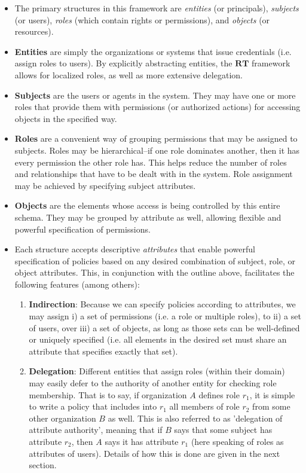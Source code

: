\documentclass{article}
\providecommand{\RT}{\textbf{RT}}
\begin{document}
\begin{itemize}
  \item The primary structures in this framework are \textit{entities} (or principals), \textit{subjects} (or users), \textit{roles} (which contain rights or permissions), and \textit{objects} (or resources).
  \item \textbf{Entities} are simply the organizations or systems that issue credentials (i.e. assign roles to users). By explicitly abstracting entities, the $\RT$ framework allows for localized roles, as well as more extensive delegation.
  \item \textbf{Subjects} are the users or agents in the system. They may have one or more roles that provide them with permissions (or authorized actions) for accessing objects in the specified way.
  \item \textbf{Roles} are a convenient way of grouping permissions that may be assigned to subjects. Roles may be hierarchical--if one role dominates another, then it has every permission the other role has. This helps reduce the number of roles and relationships that have to be dealt with in the system. Role assignment may be achieved by specifying subject attributes.
  \item \textbf{Objects} are the elements whose access is being controlled by this entire schema. They may be grouped by attribute as well, allowing flexible and powerful specification of permissions.
  \item Each structure accepts descriptive \textit{attributes} that enable powerful specification of policies based on any desired combination of subject, role, or object attributes. This, in conjunction with the outline above, facilitates the following features (among others):
  \begin{enumerate}
    \item \textbf{Indirection}: Because we can specify policies according to attributes, we may assign i) a set of permissions (i.e. a role or multiple roles), to ii) a set of users, over iii) a set of objects, as long as those sets can be well-defined or uniquely specified (i.e. all elements in the desired set must share an attribute that specifies exactly that set).
    \item \textbf{Delegation}: Different entities that assign roles (within their domain) may easily defer to the authority of another entity for checking role membership. That is to say, if organization $A$ defines role $r_1$, it is simple to write a policy that includes into $r_1$ all members of role $r_2$ from some other organization $B$ as well. This is also referred to as 'delegation of attribute authority', meaning that if $B$ says that some subject has attribute $r_2$, then $A$ says it has attribute $r_1$ (here speaking of roles as attributes of users). Details of how this is done are given in the next section.

\end{enumerate}
\end{itemize}
\end{document}
